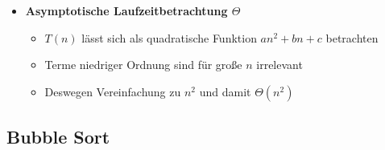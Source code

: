 \begin{itemize}
        \item \textbf{Asymptotische Laufzeitbetrachtung $\Theta$} {\label{insSortLaufzeitTheta}}
            \begin{itemize}
                \item $T(n)$ lässt sich als quadratische Funktion $an^2 + bn + c$ betrachten 
                \item Terme niedriger Ordnung sind für gro\ss e $n$ irrelevant
                \item Deswegen Vereinfachung zu $n^2$ und damit $\Theta(n^2)$
            \end{itemize}
    \end{itemize}
    
\subsection{Bubble Sort}

